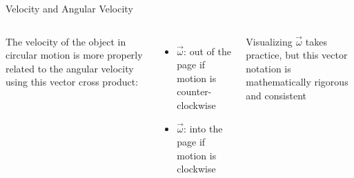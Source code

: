 \documentclass[12pt,compress,aspectratio=169]{beamer}
\begin{document}
\begin{frame}{Velocity and Angular Velocity}
  \begin{columns}

    The velocity of the object in circular motion is more properly related to
    the angular velocity using this vector cross product:


    \begin{itemize}
    \item\vspace{-.2in}$\vec\omega$: out of the page if motion is
      counter-clockwise
    \item $\vec\omega$: into the page if motion is clockwise
    \end{itemize}
    Visualizing $\vec\omega$ takes practice, but this vector notation is
    mathematically rigorous and consistent
  \end{columns}
\end{frame}



%
%
%  
\end{document}
